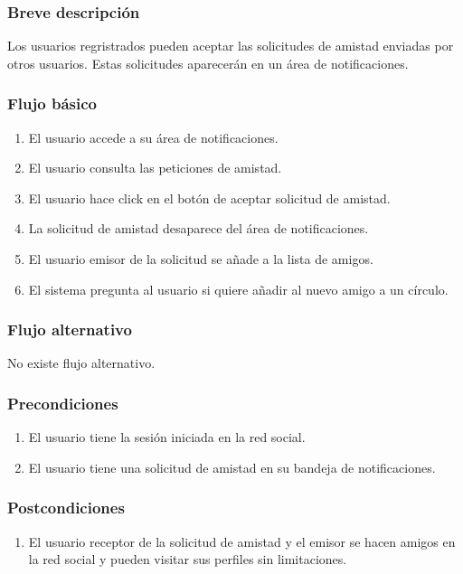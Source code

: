 \documentclass[12pt, a4paper, titlepage]{article}
\begin{document}
\subsubsection{Breve descripción}
Los usuarios regristrados pueden aceptar las solicitudes de amistad enviadas por otros usuarios. Estas solicitudes aparecerán en un área de notificaciones.
\subsubsection{Flujo básico}
\begin{enumerate}
	\item El usuario accede a su área de notificaciones.
	\item El usuario consulta las peticiones de amistad.
	\item El usuario hace click en el botón de aceptar solicitud de amistad.
	\item La solicitud de amistad desaparece del área de notificaciones.
	\item El usuario emisor de la solicitud se añade a la lista de amigos.
	\item El sistema pregunta al usuario si quiere añadir al nuevo amigo a un círculo.
\end{enumerate}
\subsubsection{Flujo alternativo}
No existe flujo alternativo.
\subsubsection{Precondiciones}
\begin{enumerate}
	\item El usuario tiene la sesión iniciada en la red social.
	\item El usuario tiene una solicitud de amistad en su bandeja de notificaciones.
\end{enumerate}
\subsubsection{Postcondiciones}
\begin{enumerate}
	\item El usuario receptor de la solicitud de amistad y el emisor se hacen amigos en la red social y pueden visitar sus perfiles sin limitaciones.
\end{enumerate}

\end{document}
